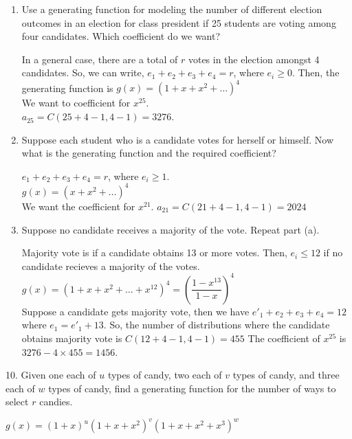 \documentclass[12pt]{article}
\begin{document}
\begin{enumerate}[label=(\alph*)]
    \item Use a generating function for modeling the number of 
    different election outcomes in an election for class president 
    if 25 students are voting among four candidates. 
    Which coefficient do we want?
    \begin{solution}
        In a general case, there are a total of $r$ votes in the 
        election amongst 4 candidates. So, we can write, 
        $e_1+e_2+e_3+e_4 = r$, where $e_i \ge0$. Then, the generating
        function is $g(x)=(1+x+x^2+\dots)^4$ \\
        We want to coefficient for $x^{25}$. \\
        $a_{25}=C(25+4-1, 4-1)=3276$.  
    \end{solution}
    \item Suppose each student who is a candidate votes for herself 
    or himself. Now what is the generating function and the required 
    coefficient?
    \begin{solution}
        $e_1+e_2+e_3+e_4=r$, where $e_i\ge 1$. \\
        $g(x) = (x+x^2+\dots)^4$\\
        We want the coefficient for $x^{21}$. $a_{21}=C(21+4-1,4-1)=2024$
    \end{solution}
    \item Suppose no candidate receives a majority of the vote. 
    Repeat part (a).
    \begin{solution}
        Majority vote is if a candidate obtains 13 or more votes. 
        Then, $e_i \le 12$ if no candidate recieves a majority of
        the votes. \\
        $g(x)=(1+x+x^2+\dots+x^{12})^4 = (\dfrac{1-x^{13}}{1-x})^4$\\
        Suppose a candidate gets majority vote, then we have 
        $e'_1+e_2+e_3+e_4=12$ where $e_1 = e'_1 + 13$. So, the
        number of distributions where the candidate obtains majority 
        vote is $C(12+4-1, 4-1)=455$ The coefficient of $x^25$ is 
        $3276 - 4\times 455=1456$.  
    \end{solution}
\end{enumerate}
10. Given one each of $u$ types of candy, two each of $v$ types of 
candy, and three each of $w$ types of candy, find a generating 
function for the number of ways to select $r$ candies.
\begin{solution}
    $g(x) = (1+ x)^u(1+x+x^2)^v(1+x+x^2+x^3)^w$
\end{solution}
\end{document}
